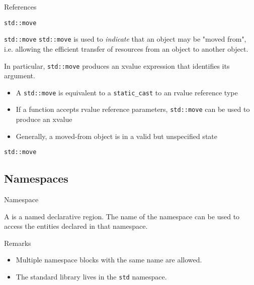 \begin{frame}{References}{}
  \begin{examples}[References]
    \small
  \end{examples}
\end{frame}

\begin{frame}{\texttt{std::move}}{}
  \begin{block}{\texttt{std::move}}
    \lstinline!std::move! is used to \emph{indicate} that an object may be "moved from", i.e. allowing the efficient transfer of resources from an object to another object.

    In particular, \lstinline!std::move! produces an xvalue expression that identifies its argument.

    \begin{itemize}
    \item
      A \lstinline!std::move! is equivalent to a \lstinline!static_cast! to an rvalue reference type
    \item
      If a function accepts rvalue reference parameters, \lstinline!std::move! can be used to produce an xvalue
    \item
      Generally, a moved-from object is in a valid but unspecified state
    \end{itemize}
  \end{block}
\end{frame}

\begin{frame}{\texttt{std::move}}{}
  \begin{example}
  \end{example}
\end{frame}


\subsection{Namespaces}

\begin{frame}{Namespace}{}
  \begin{definition}[Namespace]
  A  is a named declarative region. The name of the namespace can be used to access the entities declared in that namespace.
  \end{definition}

  \begin{block}{Remarks}
    \begin{itemize}
    \item
      Multiple namespace blocks with the same name are allowed.
    \item
      The standard library lives in the \lstinline!std! namespace.
    \end{itemize}
  \end{block}

  \begin{example}[Namespace]
  \end{example}
\end{frame}

